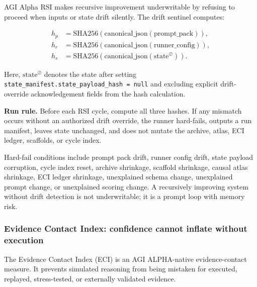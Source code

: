 AGI Alpha RSI makes recursive improvement underwritable by refusing to
proceed when inputs or state drift silently. The drift sentinel
computes:

\[
\begin{aligned}
h_p &= \mathrm{SHA256}(\mathrm{canonical\_json}(\mathrm{prompt\_pack})),\\
h_r &= \mathrm{SHA256}(\mathrm{canonical\_json}(\mathrm{runner\_config})),\\
h_s &= \mathrm{SHA256}(\mathrm{canonical\_json}(\mathrm{state}^{\oslash})).
\end{aligned}
\]

Here, \(\mathrm{state}^{\oslash}\) denotes the state after setting
\texttt{state\_manifest.state\_payload\_hash\ =\ null} and excluding
explicit drift-override acknowledgement fields from the hash
calculation.

\textbf{Run rule.} Before each RSI cycle, compute all three hashes. If
any mismatch occurs without an authorized drift override, the runner
hard-fails, outputs a run manifest, leaves state unchanged, and does not
mutate the archive, atlas, ECI ledger, scaffolds, or cycle index.

Hard-fail conditions include prompt pack drift, runner config drift,
state payload corruption, cycle index reset, archive shrinkage, scaffold
shrinkage, causal atlas shrinkage, ECI ledger shrinkage, unexplained
schema change, unexplained prompt change, or unexplained scoring change.
A recursively improving system without drift detection is not
underwritable; it is a prompt loop with memory risk.

\subsubsection{Evidence Contact Index: confidence cannot inflate without
execution}\label{evidence-contact-index-confidence-cannot-inflate-without-execution}

The Evidence Contact Index (ECI) is an AGI ALPHA-native evidence-contact
measure. It prevents simulated reasoning from being mistaken for
executed, replayed, stress-tested, or externally validated evidence.

